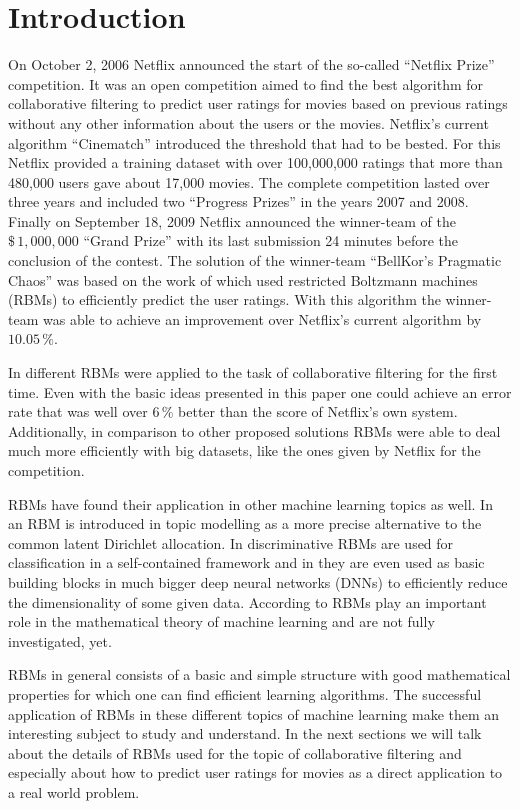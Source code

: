 \documentclass[crop=false,10pt]{standalone}
\begin{document}
  \section{Introduction} %
  \label{sec:introduction}
    On October 2, 2006 Netflix announced the start of the so-called \enquote{Netflix Prize} competition.
    It was an open competition aimed to find the best algorithm for collaborative filtering to predict user ratings for movies based on previous ratings without any other information about the users or the movies.
    Netflix's current algorithm \enquote{Cinematch} introduced the threshold that had to be bested.
    For this Netflix provided a training dataset with over 100,000,000 ratings that more than 480,000 users gave about 17,000 movies.
    The complete competition lasted over three years and included two \enquote{Progress Prizes} in the years 2007 and 2008.
    Finally on September 18, 2009 Netflix announced the winner-team of the $\$\, 1,000,000$ \enquote{Grand Prize} with its last submission 24 minutes before the conclusion of the contest.
    The solution of the winner-team \enquote{BellKor's Pragmatic Chaos} was based on the work of \cite{Hinton2007} which used restricted Boltzmann machines (RBMs) to efficiently predict the user ratings.
    With this algorithm the winner-team was able to achieve an improvement over Netflix's current algorithm by $10.05\,\%$.
    \cite{Hinton2007,NetflixPrize,NetflixPrizeDataset}

    In \cite{Hinton2007} different RBMs were applied to the task of collaborative filtering for the first time.
    Even with the basic ideas presented in this paper one could achieve an error rate that was well over $6\,\%$ better than the score of Netflix's own system.
    Additionally, in comparison to other proposed solutions RBMs were able to deal much more efficiently with big datasets, like the ones given by Netflix for the competition.
    \cite{Hinton2007}

    RBMs have found their application in other machine learning topics as well.
    In \cite{Murphy2012} an RBM is introduced in topic modelling as a more precise alternative to the common latent Dirichlet allocation.
    In \cite{Larochelle2008} discriminative RBMs are used for classification in a self-contained framework and in \cite{Hinton2006} they are even used as basic building blocks in much bigger deep neural networks (DNNs) to efficiently reduce the dimensionality of some given data.
    According to \cite{Montufar2018} RBMs play an important role in the mathematical theory of machine learning and are not fully investigated, yet.

    RBMs in general consists of a basic and simple structure with good mathematical properties for which one can find efficient learning algorithms.
    The successful application of RBMs in these different topics of machine learning make them an interesting subject to study and understand.
    In the next sections we will talk about the details of RBMs used for the topic of collaborative filtering and especially about how to predict user ratings for movies as a direct application to a real world problem.
\end{document}
